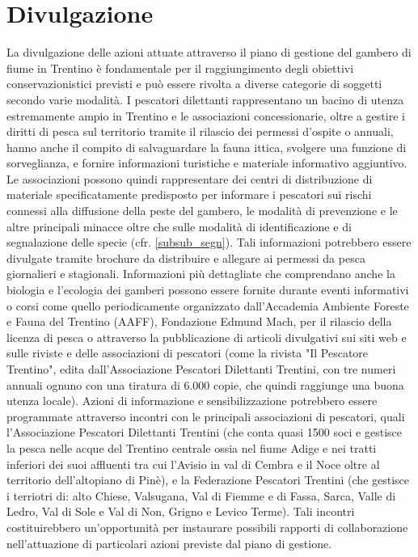 \documentclass[11pt,a4paper,italian,twoside,openany]{memoir}
\begin{document}
\section{Divulgazione}  
\label{sec_div}
La divulgazione delle azioni attuate attraverso il piano di gestione del gambero di fiume in Trentino è fondamentale per il raggiungimento degli obiettivi conservazionistici previsti e può essere rivolta a diverse categorie di soggetti secondo varie modalità.  
I pescatori dilettanti rappresentano un bacino di utenza estremamente ampio in Trentino e le associazioni concessionarie, oltre a gestire i diritti di pesca sul territorio tramite il rilascio dei permessi d'ospite o annuali, hanno anche il compito di salvaguardare la fauna ittica, svolgere una funzione di sorveglianza, e fornire informazioni turistiche e materiale informativo aggiuntivo. Le associazioni possono quindi rappresentare dei centri di distribuzione di materiale specificatamente predisposto per informare i pescatori sui rischi connessi alla diffusione della peste del gambero, le modalità di prevenzione e le altre principali minacce oltre che sulle modalità di identificazione e di segnalazione delle specie (cfr. \ref{subsub_segn}). Tali informazioni potrebbero essere divulgate tramite brochure da distribuire e allegare ai permessi da pesca giornalieri e stagionali. Informazioni più dettagliate che comprendano anche la biologia e l'ecologia dei gamberi possono essere fornite durante eventi informativi o corsi come quello periodicamente organizzato dall'Accademia Ambiente Foreste e Fauna del Trentino (AAFF), Fondazione Edmund Mach, per il rilascio della licenza di pesca o attraverso la pubblicazione di articoli divulgativi sui siti web e sulle riviste e delle associazioni di pescatori (come la rivista "Il Pescatore Trentino", edita dall'Associazione Pescatori Dilettanti Trentini, con tre numeri annuali ognuno con una tiratura di 6.000 copie, che quindi raggiunge una buona utenza locale). Azioni di informazione e sensibilizzazione potrebbero essere programmate attraverso incontri con le principali associazioni di pescatori, quali l'Associazione Pescatori Dilettanti Trentini (che conta quasi 1500 soci e gestisce la pesca nelle acque del Trentino centrale ossia nel fiume Adige e nei tratti inferiori dei suoi affluenti tra cui l'Avisio in val di Cembra e il Noce oltre al territorio dell'altopiano di Pinè), e la Federazione Pescatori Trentini (che gestisce i terriotri di: alto Chiese, Valsugana, Val di Fiemme e di Fassa, Sarca, Valle di Ledro, Val di Sole e Val di Non, Grigno e Levico Terme). Tali incontri costituirebbero un'opportunità per instaurare possibili rapporti di collaborazione nell'attuazione di particolari azioni previste dal piano di gestione.  
\end{document}
